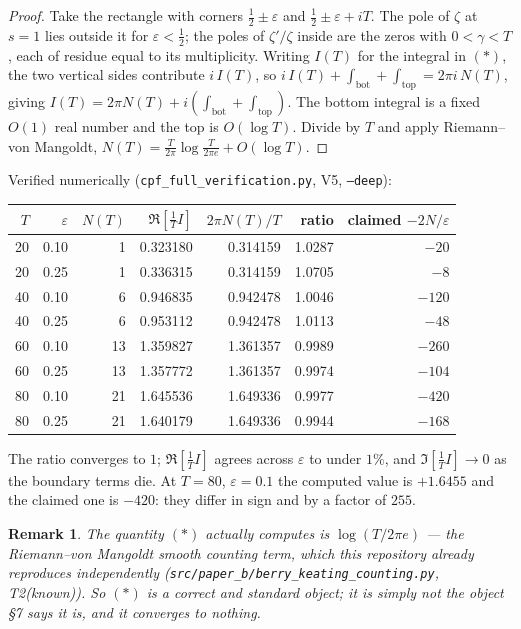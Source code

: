 \documentclass[11pt,a4paper]{article}
\newtheorem{remark}{Remark}
\begin{document}
\begin{proof}
Take the rectangle with corners $\tfrac12\pm\varepsilon$ and
$\tfrac12\pm\varepsilon+iT$. The pole of $\zeta$ at $s=1$ lies outside it for
$\varepsilon<\tfrac12$; the poles of $\zeta'/\zeta$ inside are the zeros with
$0<\gamma<T$, each of residue equal to its multiplicity. Writing $I(T)$ for the
integral in $(\ast)$, the two vertical sides contribute $i\,I(T)$, so
$i\,I(T)+\int_{\mathrm{bot}}+\int_{\mathrm{top}} = 2\pi i\,N(T)$, giving
$I(T)=2\pi N(T)+i(\int_{\mathrm{bot}}+\int_{\mathrm{top}})$. The bottom integral is a
fixed $O(1)$ real number and the top is $O(\log T)$. Divide by $T$ and apply
Riemann--von Mangoldt, $N(T)=\tfrac{T}{2\pi}\log\tfrac{T}{2\pi e}+O(\log T)$.
\end{proof}

Verified numerically (\texttt{cpf\_full\_verification.py}, V5, \texttt{--deep}):

\begin{center}\small
\begin{tabular}{rrrrrrr}
\toprule
$T$ & $\varepsilon$ & $N(T)$ & $\Re[\tfrac1T I]$ & $2\pi N(T)/T$ & ratio &
  claimed $-2N/\varepsilon$ \\
\midrule
20 & 0.10 & 1  & 0.323180 & 0.314159 & 1.0287 & $-20$ \\
20 & 0.25 & 1  & 0.336315 & 0.314159 & 1.0705 & $-8$ \\
40 & 0.10 & 6  & 0.946835 & 0.942478 & 1.0046 & $-120$ \\
40 & 0.25 & 6  & 0.953112 & 0.942478 & 1.0113 & $-48$ \\
60 & 0.10 & 13 & 1.359827 & 1.361357 & 0.9989 & $-260$ \\
60 & 0.25 & 13 & 1.357772 & 1.361357 & 0.9974 & $-104$ \\
80 & 0.10 & 21 & 1.645536 & 1.649336 & 0.9977 & $-420$ \\
80 & 0.25 & 21 & 1.640179 & 1.649336 & 0.9944 & $-168$ \\
\bottomrule
\end{tabular}
\end{center}

The ratio converges to $1$; $\Re[\tfrac1T I]$ agrees across $\varepsilon$ to under
$1\%$, and $\Im[\tfrac1T I]\to0$ as the boundary terms die. At $T=80$,
$\varepsilon=0.1$ the computed value is $+1.6455$ and the claimed one is $-420$:
they differ in sign and by a factor of $255$.

\begin{remark}
The quantity $(\ast)$ actually computes is $\log(T/2\pi e)$ --- the Riemann--von
Mangoldt \emph{smooth counting term}, which this repository already reproduces
independently (\texttt{src/paper\_b/berry\_keating\_counting.py}, T2(known)). So
$(\ast)$ is a correct and standard object; it is simply not the object \S7 says it
is, and it converges to nothing.
\end{remark}
\end{document}
